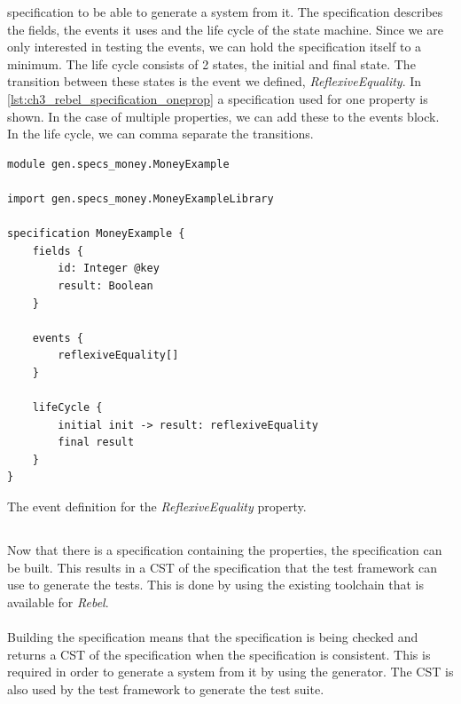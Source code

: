 specification to be able to generate a system from it. The specification
describes the fields, the events it uses and the life cycle of the state
machine. Since we are only interested in testing the events, we can hold the
specification itself to a minimum. The life cycle consists of 2 states, the
initial and final state. The transition between these states is the event we
defined, \textit{ReflexiveEquality}. In
\autoref{lst:ch3_rebel_specification_oneprop} a specification used for one
property is shown. In the case of multiple properties, we can add these to the
events block. In the life cycle, we can comma separate the transitions.
\begin{sourcecode}[!ht]
\begin{lstlisting}[language=Rebel]
module gen.specs_money.MoneyExample

import gen.specs_money.MoneyExampleLibrary

specification MoneyExample {
	fields {
        id: Integer @key
		result: Boolean
	}

	events {
		reflexiveEquality[]
	}

	lifeCycle {
		initial init -> result:	reflexiveEquality
		final result
	}
}
\end{lstlisting}
\caption{The event definition for the \textit{ReflexiveEquality} property.}
\label{lst:ch3_rebel_specification_oneprop}
\end{sourcecode}
\FloatBarrier

\subsection{\tfPhaseTwo{}}
Now that there is a specification containing the properties, the specification
can be built. This results in a CST of the specification that the test framework
can use to generate the tests. This is done by using the existing toolchain that
is available for \textit{Rebel}.\\
\\
Building the specification means that the specification is being checked and
returns a CST of the specification when the specification is consistent. This is
required in order to generate a system from it by using the generator. The CST
is also used by the test framework to generate the test suite.

